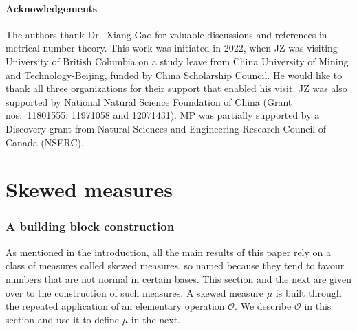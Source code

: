\documentclass[12pt, twoside]{article}
\theoremstyle{definition}
\numberwithin{equation}{section}
\begin{document}
\subsection{Acknowledgements} 
The authors thank Dr.~Xiang Gao for valuable discussions and references in metrical number theory. This work was initiated in 2022, when JZ was visiting University of British Columbia on a study leave from China University of Mining and Technology-Beijing, funded by China Scholarship Council. He would like to thank all three organizations for their support that enabled his visit. JZ was also supported by National Natural Science Foundation of China  (Grant nos.~11801555, 11971058 and 12071431). MP was partially supported by a Discovery grant from Natural Sciences and Engineering Research Council of Canada (NSERC). 
\newpage 
\part{Skewed measures} \label{intro-part}
\section{A building block construction} \label{elem-op-section} 
As mentioned in the introduction, all the main results of this paper rely on a class of measures called skewed measures, so named because they tend to favour numbers that are not normal in certain bases. This section and the next are given over to the construction of such measures. A skewed measure $\mu$ is built through the repeated application of an elementary operation $\mathscr{O}$. We describe $\mathscr{O}$ in this section and use it to define  $\mu$ in the next.  
\end{document}
